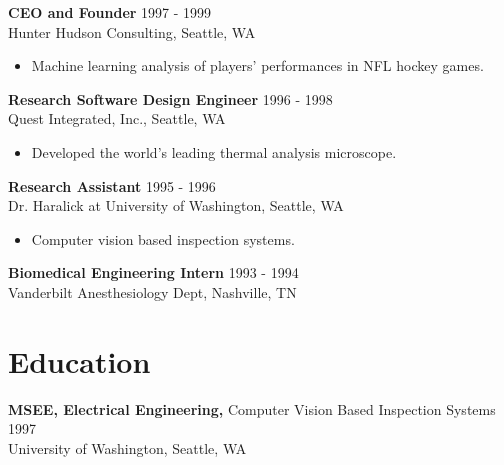 \begin{resume}
 {\bf CEO and Founder} \hfill 1997 - 1999\\
 Hunter Hudson Consulting, Seattle, WA
 \begin{itemize} \itemsep -2pt
 \item Machine learning analysis of players' performances in NFL hockey games.
 \end{itemize}
  
 {\bf Research Software Design Engineer} \hfill 1996 - 1998\\
 Quest Integrated, Inc., Seattle, WA 
 \begin{itemize} \itemsep -2pt  %
 \item Developed the world's leading thermal analysis microscope.
 \end{itemize}

 {\bf Research Assistant} \hfill 1995 - 1996\\
 Dr. Haralick at University of Washington, Seattle, WA
\begin{itemize} \itemsep -2pt  %
\item Computer vision based inspection systems.
\end{itemize}
 
 {\bf Biomedical Engineering Intern} \hfill 1993 - 1994\\
 Vanderbilt Anesthesiology Dept, Nashville, TN

\section{Education} 

{\bf MSEE, Electrical Engineering,} Computer Vision Based Inspection Systems \hfill 1997\\
University of Washington, Seattle, WA


\end{resume}
